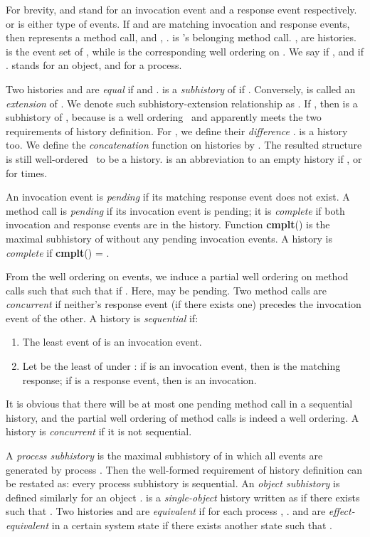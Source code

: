 \documentclass[a4paper,USenglish]{lipics-v2016}
\newcommand{\cmplt}{\textbf{cmplt}}
\newcommand{\his}{\text{H}}
\begin{document}
For brevity,  and  stand for an invocation event and a response event respectively.
 or  is either type of events.
If  and  are matching invocation and response events,
then  represents a method call,
and , .
 is 's belonging method call.
{\his},  are histories.
 is the event set of {\his}, while  is the corresponding well ordering on .
We say  if , and  if .
 stands for an object, and  for a process.

Two histories  and  are \textit{equal}
if  and .
 is a \textit{subhistory} of 
if .
Conversely,  is called an \textit{extension} of .
We denote such subhistory-extension relationship as .
If ,
then  is a subhistory of ,
because  is a well ordering~\cite{Enderton77}
and  apparently meets the two requirements of history definition.
For , we define their \textit{difference}
.
 is a history too.
We define the \textit{concatenation} function on histories by
.
The resulted structure is still well-ordered~\cite{Enderton77} to be a history.
 is an abbreviation to an empty history  if ,
or  for  times.

An invocation event is \textit{pending} if its matching response event does not exist.
A method call is \textit{pending} if its invocation event is pending;
it is \textit{complete} if both invocation and response events are in the history.
Function \cmplt(\his) is the maximal subhistory of {\his} without any pending invocation events.
A history {\his} is \textit{complete} if \cmplt({\his}) = {\his}.


From the well ordering on events, we induce a partial well ordering on method calls such that such that  if .
Here,  may be pending.
Two method calls are \textit{concurrent} if neither's response event (if there exists one) precedes the invocation event of the other.
A history {\his} is \textit{sequential} if:
\begin{enumerate}[(1)]
	\item
	The least event of {\his} is an invocation event.
	\item
	Let  be the least of  under :
	if  is an invocation event, then  is the matching response;
	if  is a response event, then  is an invocation.
\end{enumerate}
It is obvious that there will be at most one pending method call in a sequential history, and the partial well ordering of method calls is indeed a well ordering.
A history is \textit{concurrent} if it is not sequential.

A \textit{process subhistory}  is the maximal subhistory of {\his} in which all events are generated by process .
Then the well-formed requirement of history definition can be restated as: every process subhistory is sequential.
An \textit{object subhistory}  is defined similarly for an object .
{\his} is a \textit{single-object} history written as  if there exists  such that .
Two histories  and  are \textit{equivalent}
if for each process , .
 and  are \textit{effect-equivalent} in a certain system state 
if there exists another state  such that
.
\end{document}
